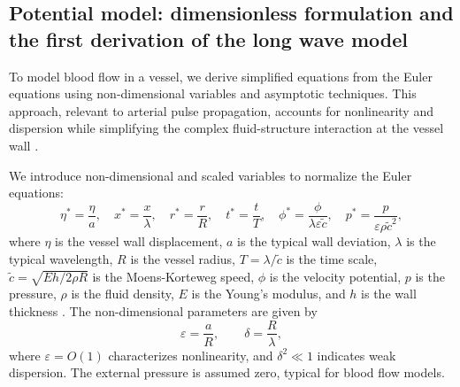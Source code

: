 \documentclass[alpha-refs, 12pt]{wiley-article}
\newcommand{\eps}{\varepsilon}
\begin{document}
\subsection{Potential model: dimensionless formulation and the first derivation of the long wave model}\label{sec:dimless_longwave}

To model blood flow in a vessel, we derive simplified equations from the Euler equations using non-dimensional variables and asymptotic techniques. This approach, relevant to arterial pulse propagation, accounts for nonlinearity and dispersion while simplifying the complex fluid-structure interaction at the vessel wall \citep{Fung1993}.

We introduce non-dimensional and scaled variables to normalize the Euler equations:
\begin{equation}\label{eq:ndv}
  \eta^* = \frac{\eta}{a}, \quad x^* = \frac{x}{\lambda}, \quad r^* = \frac{r}{R}, \quad t^* = \frac{t}{T}, \quad \phi^* = \frac{\phi}{\lambda \eps \tilde{c}}, \quad p^* = \frac{p}{\eps \rho \tilde{c}^2},
\end{equation}
where $\eta$ is the vessel wall displacement, $a$ is the typical wall deviation, $\lambda$ is the typical wavelength, $R$ is the vessel radius, $T = \lambda / \tilde{c}$ is the time scale, $\tilde{c} = \sqrt{E h / 2 \rho R}$ is the Moens-Korteweg speed, $\phi$ is the velocity potential, $p$ is the pressure, $\rho$ is the fluid density, $E$ is the Young's modulus, and $h$ is the wall thickness \citep{Fung1993}. The non-dimensional parameters are given by
\begin{equation}\label{eq:parameters}
  \eps = \frac{a}{R}, \qquad \delta = \frac{R}{\lambda},
\end{equation}
where $\eps = O(1)$ characterizes nonlinearity, and $\delta^2 \ll 1$ indicates weak dispersion. The external pressure is assumed zero, typical for blood flow models.
\end{document}
